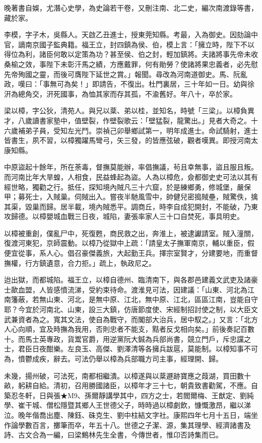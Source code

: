 \begin{pinyinscope}
晚著書自娛，尤潛心史學，為史論若干卷，又刪注南、北二史，編次南渡錄等書，藏於家。

李模，字子木，吳縣人。天啟乙丑進士，授東莞知縣。考最，入為御史。因劾論中官，謫南京國子監典籍。福王立，封四鎮為侯、伯，模上言：「擁立時，陛下不以得位為利，諸臣何敢以定策為功？甚至侯、伯之封，輕加鎮將。夫諸將事先帝未收桑榆之效，事陛下未彰汗馬之績，方應戴罪，何有勛勞？使諸將果忠義者，必先慰先帝殉國之靈，而後可膺陛下延世之賞。」報聞。尋改為河南道御史。馬、阮亂政，嘆曰：「事無可為矣！」即請告，不復出。杜門裏居，三十年如一日。幼與徐汧為總角交，汧死國事，為恤其家而存其孤，不渝舊好。年八十，卒於家。

梁以樟，字公狄，清苑人。與兄以棻、弟以桂，並知名，時號「三梁」。以樟負異才，八歲讀書家塾中，值壁裂，作壁裂歌云：「壁猛裂，龍驚出。」見者大奇之。十六歲補弟子員，受知左光鬥。崇禎己卯舉鄉試第一，明年成進士。命試騎射，進士皆書生，夙不習，以樟獨躍馬彎弓，矢三發，的皆應弦破，觀者嘆異。即授河南太康知縣。

中原盜起十餘年，所在荼毒，督撫莫能辦，率倡撫議，茍且幸無事，盜且服且叛。而河南比年大旱蝗，人相食，民益蜂起為盜。人為以樟危，僉都御史史可法以其有經世略，獨勸之行。抵任，探知境內賊凡三十六窟，於是練鄉勇，修城堡，嚴保甲；募死士，入賊巢。伺賊出入。嘗夜半馳風雪中，帥健兒密搗賊壘，賊驚佚，擒其渠，毀巢而歸。居半載，境內賊悉平。調商丘，時李自成犯開封，不能破，乃東攻歸德。以樟嬰城血戰三日夜，城陷，妻張率家人三十口自焚死，事具明史。

以樟被重創，僕亂尸中，死復甦，商民救之出，奔淮上，被逮讞請室。賊入潼關，復渡河東犯，京師震動。以樟乃從獄中上疏：「請皇太子撫軍南京，輔以重臣，假便宜從事，系人心。倡召豪傑義旅，大起勤王兵。擇宗室賢才，分建要地，而重督撫權，行方鎮遺意，合力拒。」疏上，執政尼之。

迨出獄，而都城陷。福王立，以樟自德州、臨清南下，與各郡邑建義文武吏及諸豪士歃血盟，人皆感憤流涕，受約束待命。渡淮見可法，因建議：「山東、河北為江南籓蔽，若無山東、河北，是無中原、江北，無中原、江北，區區江南，豈能自守耶？今宜於河南北、山東，設三大鎮，仿唐節度使、宋經制招討使之制，以大臣文武兼資者為之。寬其文法，使自為戰守，而閣部大治兵，居中馭之。」又言：「北方人心向順，宜及時撫為我用，否則忠者不能支，黠者反戈相向矣。」前後奏記百數十。而馬士英專政，貨鬻官爵，用逆黨阮大鋮為兵部尚書，競立門戶，斥忠讜之士，君臣日夜酣樂。左良玉、高傑、劉澤清等各擁兵跋扈，莫能制。以樟知事不可為，憤鬱成疾，辭去。可法仍舉以樟為兵部職方司主事，經理開、歸。

未幾，揚州破，可法死，南都相繼潰。以樟遂與以棻遯跡寶應之葭湖，買田數十畝，躬耕自給。清初，召用勝國諸臣，以樟年才三十七，朝貴致書勸駕，不應。自築忍冬軒，日與張★M9、孫爾靜講學其中，四方之士，若閻爾梅、王猷定、劉純學、崔干城、僧松隱暨其鄉人王世德父子，時時過以樟劇飲，慷慨激昂，繼以涕泣。晚年偕喬出塵、陳鈺、硃克生、劉中柱結文字社。康熙四年七月十五日，端坐作論學數百言，擲筆而卒，年五十八。世德之子潔、源，集其理學、經濟諸書及詩、古文合為一編，曰梁鷦林先生全書，今傳世者，惟卬否詩集而已。


\end{pinyinscope}
